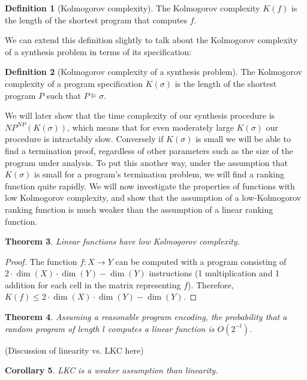 \documentclass[preprint]{sigplanconf}
\newtheorem{theorem}{Theorem}
\newtheorem{corollary}[theorem]{Corollary}
\theoremstyle{definition}
\newtheorem{definition}[theorem]{Definition}
\begin{document}
\begin{definition}[Kolmogorov complexity]
 The Kolmogorov complexity $K(f)$ is the length of the shortest program that
 computes $f$.
\end{definition}

We can extend this definition slightly to talk about the Kolmogorov complexity of a
synthesis problem in terms of its specification:

\begin{definition}[Kolmogorov complexity of a synthesis problem]
 The Kolmogorov complexity of a program specification $K(\sigma)$ is the length of the shortest
 program $P$ such that $P \models \sigma$.
\end{definition}

We will later show that the time complexity of our synthesis procedure is $NP^{NP}(K(\sigma))$,
which means that for even moderately large $K(\sigma)$ our procedure is intractably slow.  Conversely
if $K(\sigma)$ is small we will be able to find a termination proof, regardless of other parameters
such as the size of the program under analysis.  To put this another way, under the assumption
that $K(\sigma)$ is small for a program's termination problem, we will find a ranking function
quite rapidly.  We will now investigate the properties of functions with low Kolmogorov complexity,
and show that the assumption of a low-Kolmogorov ranking function is much weaker than the assumption
of a linear ranking function.


\begin{theorem}
 Linear functions have low Kolmogorov complexity.
\end{theorem}

\begin{proof}
 The function $f: X \to Y$ can be computed with a program consisting of
 $2 \cdot \dim(X) \cdot \dim(Y) - \dim(Y)$ instructions (1 multiplication and 1 addition for
 each cell in the matrix representing $f$).  Therefore,
 $K(f) \leq 2 \cdot \dim(X) \cdot \dim(Y) - \dim(Y)$.
\end{proof}

\begin{theorem}
Assuming a reasonable program encoding, the probability that a random program of length $l$ computes
a linear function is $O(2^{-l})$.
\end{theorem}

(Discussion of linearity vs. LKC here)

\iffalse
\begin{corollary}
 LKC is a weaker assumption than linearity.
\end{corollary}
\end{document}

